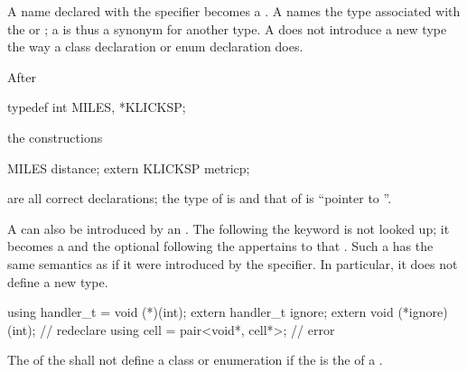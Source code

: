 A name declared with the  specifier becomes a
.
A  names
the type associated with the 
or ;
%
%
%
a  is thus a synonym for another type. A
 does not introduce a new type the way a class
declaration or enum declaration does.
\begin{example}
After
\begin{codeblock}
typedef int MILES, *KLICKSP;
\end{codeblock}
the constructions
\begin{codeblock}
MILES distance;
extern KLICKSP metricp;
\end{codeblock}
are all correct declarations; the type of  is
 and that of  is ``pointer to ''.
\end{example}

\pnum
A  can also be introduced by an
. The  following the
 keyword is not looked up; it becomes a 
and the optional  following the
 appertains to that .
Such a  has the same
semantics as if it were introduced by the  specifier. In
particular, it does not define a new type.
\begin{example}
\begin{codeblock}
using handler_t = void (*)(int);
extern handler_t ignore;
extern void (*ignore)(int);         // redeclare 
using cell = pair<void*, cell*>;    // error
\end{codeblock}
\end{example}
The 
of the  shall not define
a class or enumeration if the 
is the  of a .

